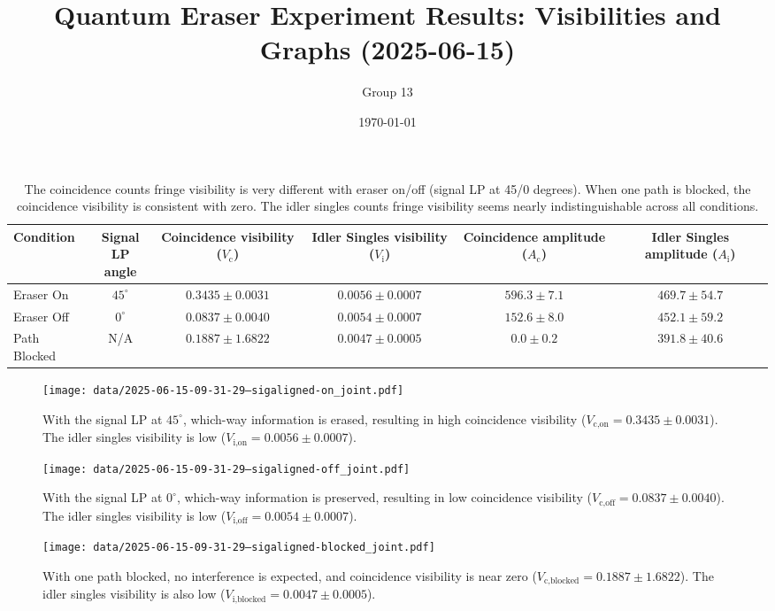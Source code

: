 \documentclass{article}
\title{Quantum Eraser Experiment Results: Visibilities and Graphs (2025-06-15)}
\author{Group 13} %
\date{\today}
\begin{document}
\pagestyle{empty} %

\begin{table}[h!]
\centering
\begin{tabular}{lccccc}
\toprule
Condition & \makecell{Signal \\ LP angle} & \makecell{Coincidence \\ visibility ($V_{\text{c}}$)} & \makecell{Idler Singles \\ visibility ($V_{\text{i}}$)} & \makecell{Coincidence \\ amplitude ($A_{\text{c}}$)} & \makecell{Idler Singles \\ amplitude ($A_{\text{i}}$)} \\
\midrule
Eraser On   & $45^\circ$ & $0.3435 \pm 0.0031$ & $0.0056 \pm 0.0007$ & $596.3 \pm 7.1$ & $469.7 \pm 54.7$ \\
Eraser Off  & $0^\circ$  & $0.0837 \pm 0.0040$ & $0.0054 \pm 0.0007$ & $152.6 \pm 8.0$ & $452.1 \pm 59.2$ \\
Path Blocked & N/A & $0.1887 \pm 1.6822$ & $0.0047 \pm 0.0005$ & $0.0 \pm 0.2$ & $391.8 \pm 40.6$ \\
\bottomrule
\end{tabular}
\caption*{
  The coincidence counts fringe visibility is very different with eraser on/off (signal LP at 45/0 degrees).
  When one path is blocked, the coincidence visibility is consistent with zero.
  The idler singles counts fringe visibility seems nearly indistinguishable across all conditions.
}
\end{table}

\begin{figure}[h!]
\centering
\texttt{[image: data/2025-06-15-09-31-29--sigaligned-on\_joint.pdf]}
\caption*{
  With the signal LP at $45^\circ$, which-way information is erased, resulting in high coincidence visibility ($V_{\text{c,on}}=0.3435 \pm 0.0031$). The idler singles visibility is low ($V_{\text{i,on}}=0.0056 \pm 0.0007$).
}
\end{figure}

\begin{figure}[h!]
\centering
\texttt{[image: data/2025-06-15-09-31-29--sigaligned-off\_joint.pdf]}
\caption*{
  With the signal LP at $0^\circ$, which-way information is preserved, resulting in low coincidence visibility ($V_{\text{c,off}}=0.0837 \pm 0.0040$). The idler singles visibility is low ($V_{\text{i,off}}=0.0054 \pm 0.0007$).
}
\end{figure}

\begin{figure}[h!]
\centering
\texttt{[image: data/2025-06-15-09-31-29--sigaligned-blocked\_joint.pdf]}
\caption*{
  With one path blocked, no interference is expected, and coincidence visibility is near zero ($V_{\text{c,blocked}}=0.1887 \pm 1.6822$). The idler singles visibility is also low ($V_{\text{i,blocked}}=0.0047 \pm 0.0005$).
}
\end{figure}
\end{document}
